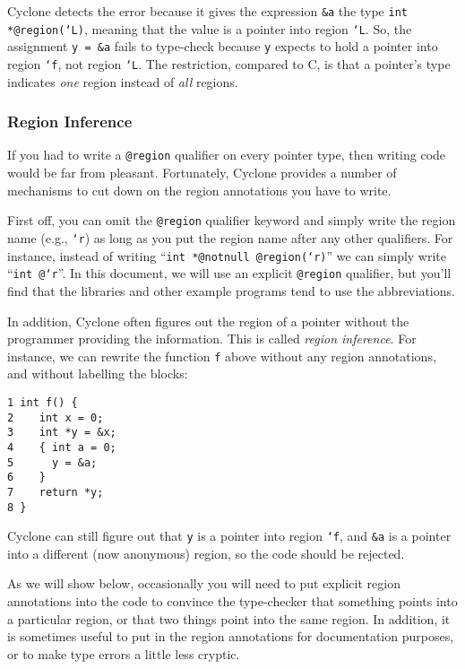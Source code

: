 Cyclone detects the error because it gives the expression \texttt{\&a}
the type \texttt{int *@region(`L)}, meaning that the value is a
pointer into region \texttt{`L}.  So, the assignment \texttt{y = \&a}
fails to type-check because \texttt{y} expects to hold a pointer into
region \texttt{`f}, not region \texttt{`L}.  The restriction, compared
to C, is that a pointer's type indicates \emph{one} region instead of
\emph{all} regions.

\subsubsection*{Region Inference}

If you had to write a \texttt{@region} qualifier on every
pointer type, then writing code would be far from pleasant.
Fortunately, Cyclone provides a number of mechanisms to
cut down on the region annotations you have to write.  

First off, you can omit the \texttt{@region} qualifier keyword
and simply write the region name (e.g., \texttt{`r}) as long
as you put the region name after any other qualifiers.  For
instance, instead of writing ``\texttt{int *@notnull @region(`r)}''
we can simply write ``\texttt{int @`r}''.  In this document,
we will use an explicit \texttt{@region} qualifier, but
you'll find that the libraries and other example programs tend
to use the abbreviations.  

In addition, Cyclone often figures out the region of a pointer
without the programmer providing the information.  This is called {\em
region inference}.  For instance, we can rewrite the function
\texttt{f} above without any region annotations, and without 
labelling the blocks:
\begin{verbatim}
1 int f() {
2    int x = 0;
3    int *y = &x;
4    { int a = 0;
5      y = &a;
6    }
7    return *y;
8 }
\end{verbatim}
Cyclone can still figure out that \texttt{y} is a pointer into
region \texttt{`f}, and \texttt{\&a} is a pointer into a different
(now anonymous) region, so the code should be rejected.

As we will show below, occasionally you will need to put explicit
region annotations into the code to convince the type-checker that
something points into a particular region, or that two things point
into the same region.  In addition, it is sometimes useful to put in
the region annotations for documentation purposes, or to make type
errors a little less cryptic.

